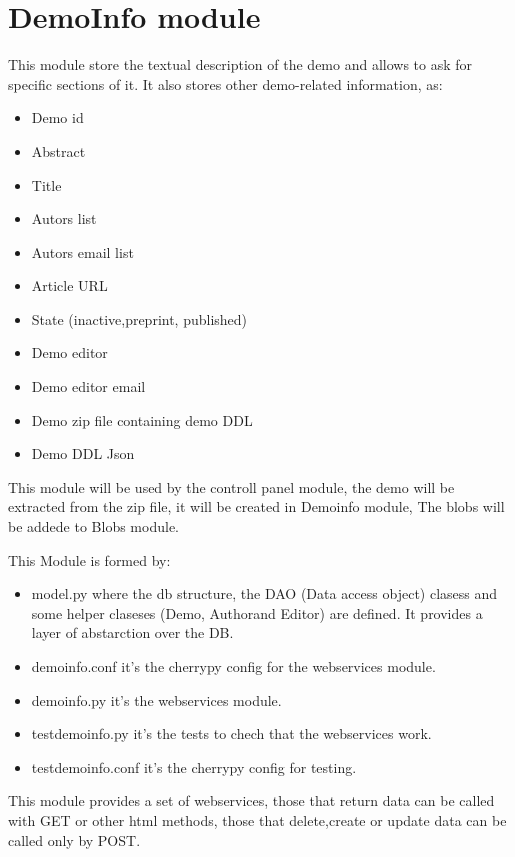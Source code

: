 \section{DemoInfo module}
This module store the textual description of the demo and allows to ask for specific sections of it. It also stores other demo-related information, as:
\begin{itemize}
\item Demo id
\item Abstract
\item Title 
\item Autors list
\item Autors email list
\item Article URL
\item State (inactive,preprint, published)
\item Demo editor
\item Demo editor email
\item Demo zip file containing demo DDL 
\item Demo DDL Json
\end{itemize}

This module will be used by the controll panel module, the demo will be extracted from the zip file, it will be created in Demoinfo module, The blobs will be addede to Blobs module.

This Module is formed by:
\begin{itemize}
\item model.py where the db structure, the DAO (Data access object) clasess and some helper claseses (Demo, Authorand Editor) are defined. It provides a layer of abstarction over the DB.
\item demoinfo.conf it's the cherrypy config for the webservices module.
\item demoinfo.py it's the webservices module.
\item testdemoinfo.py it's the tests to chech that the webservices work.
\item testdemoinfo.conf it's the cherrypy config for testing.
\end{itemize}

This module provides a set of webservices, those that return data can be called with GET or other html methods, those that delete,create or update data can be called only by POST.

